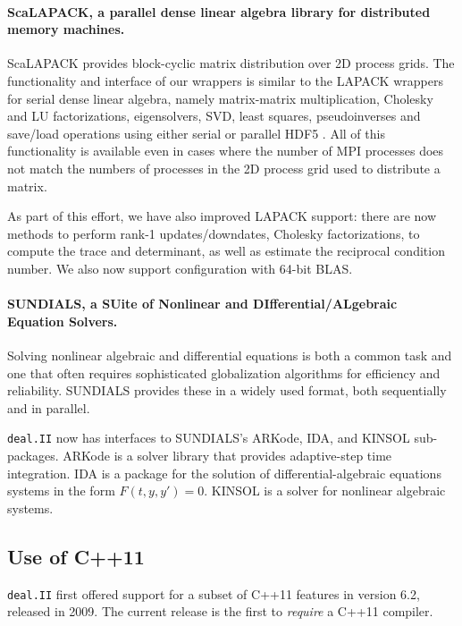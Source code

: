 \documentclass{ansarticle-preprint}
\newcommand{\specialword}[1]{\texttt{#1}}
\newcommand{\dealii}{{\specialword{deal.II}}\xspace}
\begin{document}
\paragraph*{ScaLAPACK, a parallel dense linear algebra library for distributed memory machines.}
  ScaLAPACK \cite{slug} provides block-cyclic matrix distribution over 2D
  process grids. The functionality and interface of our wrappers is similar
  to the LAPACK \cite{lapack} wrappers for serial dense linear algebra, namely
  matrix-matrix multiplication, Cholesky and LU factorizations,
  eigensolvers, SVD, least squares, pseudoinverses and save/load operations using
  either serial or parallel HDF5 \cite{hdf5}. All of this functionality is available
  even in cases where the number of MPI processes does not match the numbers of
  processes in the 2D process grid used to distribute a matrix.

  As part of this effort, we have also improved LAPACK support: there
  are now methods to perform rank-1 updates/downdates, Cholesky
  factorizations, to compute the trace and determinant, as well as
  estimate the reciprocal condition number. We also now support
  configuration with 64-bit BLAS.

\paragraph*{SUNDIALS, a SUite of Nonlinear and DIfferential/ALgebraic
  Equation Solvers.}
  Solving nonlinear algebraic and differential equations is both a
  common task and one that often requires sophisticated globalization
  algorithms for efficiency and reliability. SUNDIALS \cite{sundials}
  provides these in a widely used format, both sequentially and in parallel.

  \dealii now has interfaces to SUNDIALS's ARKode, IDA, and KINSOL sub-packages.
  ARKode is a solver library that provides adaptive-step time
  integration. IDA is a package for the solution of differential-algebraic
  equations systems in the form $F(t,y,y')=0$. KINSOL is a solver for nonlinear
  algebraic systems.

  \subsection{Use of C++11}
  \label{sec:cxx11}
\dealii first offered support for a subset of C++11 features in
version 6.2, released in 2009. The current release is the first to
\emph{require} a C++11 compiler.
\end{document}
